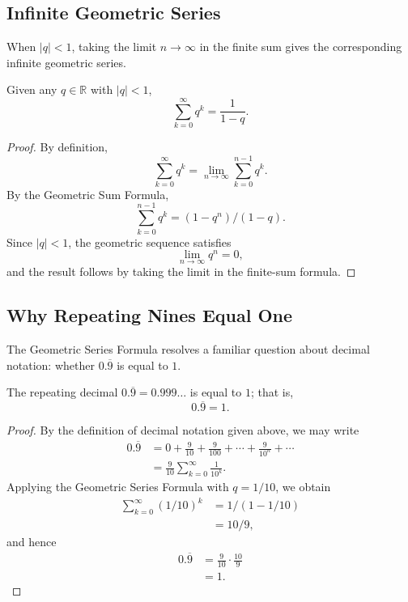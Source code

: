 \subsection{Infinite Geometric Series}

When $|q| < 1$, taking the limit $n \to \infty$ in the finite sum gives the corresponding infinite geometric series.

\begin{theorem}
Given any $q \in \mathbb{R}$ with $|q| < 1$,
\[
\sum_{k=0}^{\infty} q^k = \frac{1}{1-q}.
\]

\end{theorem}

\begin{proof}
By definition,
\[
\sum_{k=0}^{\infty} q^k = \lim_{n \to \infty} \sum_{k=0}^{n-1} q^k.
\]
By the Geometric Sum Formula,
\[
\sum_{k=0}^{n-1} q^k = (1 - q^n)/(1-q).
\]
Since $|q| < 1$, the geometric sequence satisfies
\[
\lim_{n \to \infty} q^n = 0,
\]
and the result follows by taking the limit in the finite-sum formula.
\end{proof}



\subsection{Why Repeating Nines Equal One}

The Geometric Series Formula resolves a familiar question about decimal notation: whether $0.\overline{9}$ is equal to $1$.

\begin{theorem}[Repeating Nines: $0.999\ldots=1$]
The repeating decimal $0.\overline{9}=0.999\ldots$ is equal to $1$; that
is,
\[
0.\overline{9}=1.
\]
\end{theorem}

\begin{proof}
By the definition of decimal notation given above, we may write
\[
\begin{aligned}
0.\overline{9} &= 0 + \frac{9}{10} + \frac{9}{100} + \cdots + \frac{9}{10^n} + \cdots \\
&= \frac{9}{10} \sum_{k=0}^{\infty} \frac{1}{10^k}.
\end{aligned}
\]
Applying the Geometric Series Formula with $q = 1/10$, we obtain
\[
\begin{aligned}
\sum_{k=0}^{\infty} (1/10)^k &= 1/(1 - 1/10) \\
&= 10/9,
\end{aligned}
\]
and hence
\[
\begin{aligned}
0.\overline{9} &= \frac{9}{10} \cdot \frac{10}{9} \\
&= 1.
\end{aligned}
\]

\end{proof}


